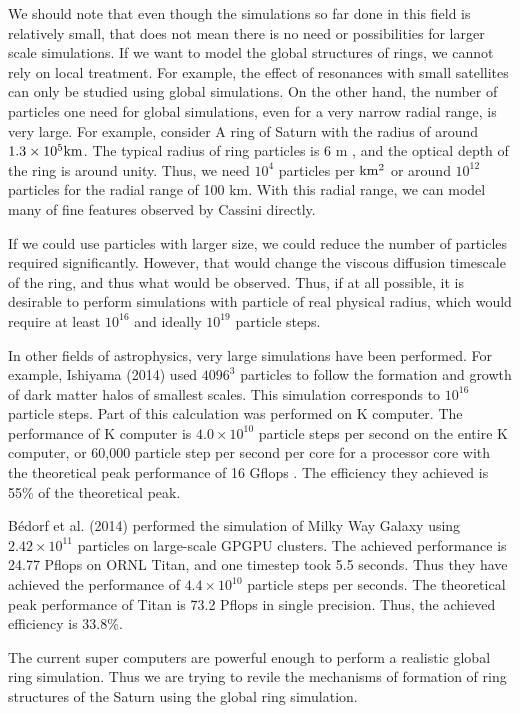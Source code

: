 \documentclass[oribibl]{llncs}
\begin{document}
We should note that even though the simulations so far done in this
field is relatively small, that does not mean there is no need or
possibilities for larger scale simulations. If we want to model the
global structures of rings, we cannot rely on local treatment. For
example, the effect of resonances with small satellites can only be
studied using global simulations. On the other hand, the number of
particles one need for global simulations, even for a very narrow
radial range, is very large. For example, consider A ring of Saturn
with the radius of around $1.3\times 10^5\rm km$. The typical radius
of ring particles is 6 m \cite{1985Icar...64..531Z}, and the optical
depth of the ring is around unity. Thus, we need $10^4$ particles per
$\rm km^2$ or around $10^{12}$ particles for the radial range of 100
km. With this radial range, we can model many of fine features
observed by Cassini directly.

If we could use particles with larger size, we could reduce the number
of particles required significantly. However, that would change the
viscous diffusion timescale of the ring, and thus what would be
observed. Thus, if at all possible, it is desirable to perform
simulations with particle of real physical radius, which would require
at least $10^{16}$ and ideally $10^{19}$ particle steps.

In other fields of astrophysics, very large simulations have been
performed. For example, Ishiyama (2014) \cite{2014ApJ...788...27I}
used $4096^3$ particles to follow the formation and growth of dark
matter halos of smallest scales. This simulation corresponds to
$10^{16}$ particle steps. Part of this calculation was performed on K
computer. The performance of K computer is $4.0\times 10^{10}$
particle steps per second on the entire K computer, or 60,000 particle
step per second per core for a processor core with the theoretical
peak performance of 16 Gflops \cite{Ishiyama2012} . The efficiency
they achieved is 55\% of the theoretical peak.

B{\'e}dorf et al. (2014) \cite{2014hpcn.conf...54B} performed the
simulation of Milky Way Galaxy using $2.42 \times 10^{11}$ particles
on large-scale GPGPU clusters. The achieved performance is 24.77
Pflops on ORNL Titan, and one timestep took 5.5 seconds. Thus they
have achieved the performance of $4.4 \times 10^{10}$ particle steps
per seconds. The theoretical peak performance of Titan is 73.2 Pflops
in single precision. Thus, the achieved efficiency is 33.8\%.

The current super computers are powerful enough to perform a realistic
global ring simulation. Thus we are trying to revile the mechanisms of
formation of ring structures of the Saturn using the global ring
simulation.
\end{document}
